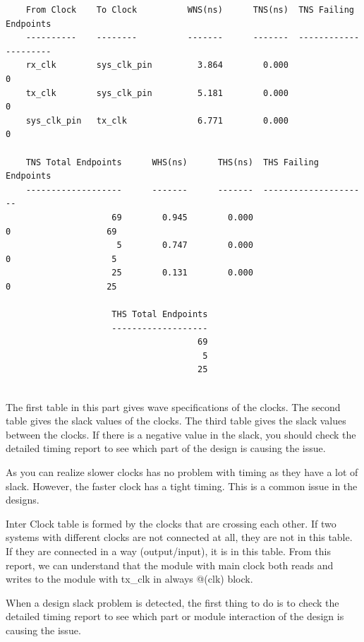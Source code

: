 \documentclass{report}
\begin{document}
\begin{verbatim}
    From Clock    To Clock          WNS(ns)      TNS(ns)  TNS Failing Endpoints
    ----------    --------          -------      -------  ---------------------
    rx_clk        sys_clk_pin         3.864        0.000                      0
    tx_clk        sys_clk_pin         5.181        0.000                      0
    sys_clk_pin   tx_clk              6.771        0.000                      0

    TNS Total Endpoints      WHS(ns)      THS(ns)  THS Failing Endpoints
    -------------------      -------      -------  ---------------------
                     69        0.945        0.000                      0                   69 
                      5        0.747        0.000                      0                    5
                     25        0.131        0.000                      0                   25    

                     THS Total Endpoints
                     -------------------    
                                      69
                                       5
                                      25
    
\end{verbatim}
The first table in this part gives wave specifications of the clocks. The second table gives the slack values of the clocks. The third table gives the slack values between the clocks. If there is a negative value in the slack, you should check the detailed timing report to see which part of the design is causing the issue.

As you can realize slower clocks has no problem with timing as they have a lot of slack. However, the faster clock has a tight timing. This is a common issue in the designs.

Inter Clock table is formed by the clocks that are crossing each other. If two systems with different clocks are not connected at all, they are not in this table. If they are connected in a way (output/input), it is in this table.
From this report, we can understand that the module with main clock both reads and writes to the module with tx\_clk in always @(clk) block.                                                                                                                                                                                                                                                        

When a design slack problem is detected, the first thing to do is to check the detailed timing report to see which part or module interaction of the design is causing the issue.
\end{document}
